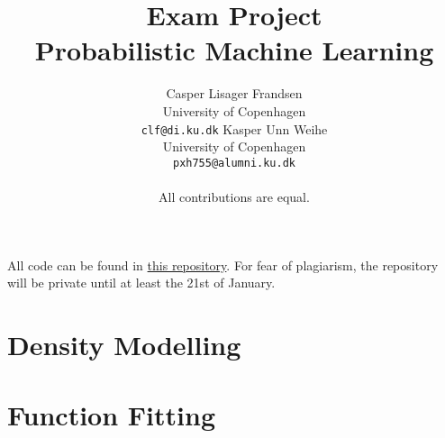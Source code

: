 \documentclass{article}
\title{
  Exam Project\\
  Probabilistic Machine Learning
}
\author{Casper Lisager Frandsen\\
  University of Copenhagen\\
  \texttt{clf@di.ku.dk}
  \AND           %
  Kasper Unn Weihe\\
  University of Copenhagen\\
  \texttt{pxh755@alumni.ku.dk}\\\\
  All contributions are equal.
}
\begin{document}
\maketitle



\appendix %

All code can be found in \href{https://github.com/Cavtheman/pml}{this repository}. For fear of plagiarism, the repository will be private until at least the 21st of January.
\section{Density Modelling}


\section{Function Fitting}






%
%
\end{document}
